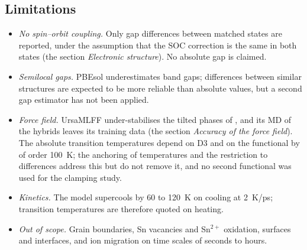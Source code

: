 \subsection*{Limitations}
\label{sec:limitations}

\begin{itemize}
  \item \emph{No spin--orbit coupling.} Only gap differences between matched states are
    reported, under the assumption that the SOC correction is the same in both states
    (the section \emph{Electronic structure}). No absolute gap is claimed. 
  \item \emph{Semilocal gaps.} PBEsol underestimates band gaps; differences between similar
    structures are expected to be more reliable than absolute values, but a second gap
    estimator has not been applied.
  \item \emph{Force field.} UrsaMLFF under-stabilises the tilted phases of \CsSnI{}, and its
    MD of the hybrids leaves its training data (the section \emph{Accuracy of the force field}). The absolute
    transition temperatures depend on D3 and on the functional by of order \SI{100}{K};
    the anchoring of temperatures and the restriction to differences address this but do
    not remove it, and no second functional was used for the clamping study.
  \item \emph{Kinetics.} The model supercools by 60 to \SI{120}{K} on cooling at
    \SI{2}{K/ps}; transition temperatures are therefore quoted on heating.
  \item \emph{Out of scope.} Grain boundaries, Sn vacancies and Sn$^{2+}$ oxidation,
    surfaces and interfaces, and ion migration on time scales of seconds to hours.
\end{itemize}

